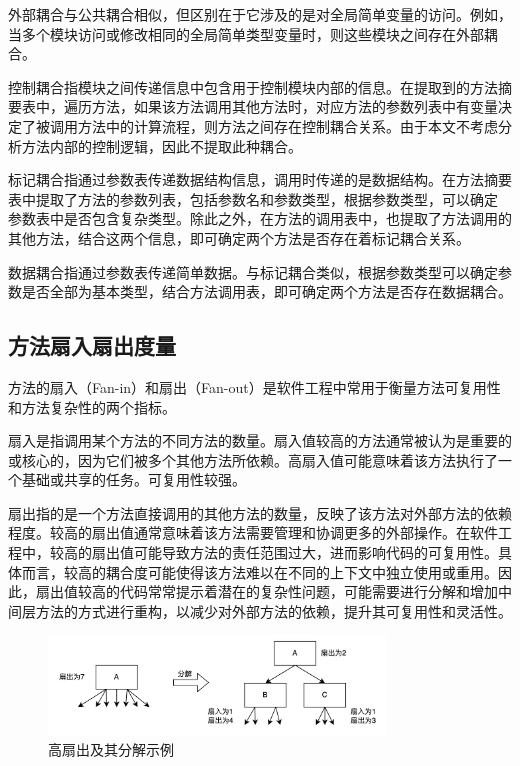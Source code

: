 外部耦合与公共耦合相似，但区别在于它涉及的是对全局简单变量的访问。例如，当多个模块访问或修改相同的全局简单类型变量时，则这些模块之间存在外部耦合。


控制耦合指模块之间传递信息中包含用于控制模块内部的信息。在提取到的方法摘
要表中，遍历方法，如果该方法调用其他方法时，对应方法的参数列表中有变量决定了被调用方法中的计算流程，则方法之间存在控制耦合关系。由于本文不考虑分析方法内部的控制逻辑，因此不提取此种耦合。


标记耦合指通过参数表传递数据结构信息，调用时传递的是数据结构。在方法摘要
表中提取了方法的参数列表，包括参数名和参数类型，根据参数类型，可以确定
参数表中是否包含复杂类型。除此之外，在方法的调用表中，也提取了方法调用的
其他方法，结合这两个信息，即可确定两个方法是否存在着标记耦合关系。


数据耦合指通过参数表传递简单数据。与标记耦合类似，根据参数类型可以确定参
数是否全部为基本类型，结合方法调用表，即可确定两个方法是否存在数据耦合。

\subsection{方法扇入扇出度量}

方法的扇入（Fan-in）和扇出（Fan-out）是软件工程中常用于衡量方法可复用性和方法复杂性的两个指标。



扇入是指调用某个方法的不同方法的数量。扇入值较高的方法通常被认为是重要的或核心的，因为它们被多个其他方法所依赖。高扇入值可能意味着该方法执行了一个基础或共享的任务。可复用性较强。

扇出指的是一个方法直接调用的其他方法的数量，反映了该方法对外部方法的依赖程度。较高的扇出值通常意味着该方法需要管理和协调更多的外部操作。在软件工程中，较高的扇出值可能导致方法的责任范围过大，进而影响代码的可复用性。具体而言，较高的耦合度可能使得该方法难以在不同的上下文中独立使用或重用。因此，扇出值较高的代码常常提示着潜在的复杂性问题，可能需要进行分解和增加中间层方法的方式进行重构，以减少对外部方法的依赖，提升其可复用性和灵活性。

\begin{figure}[h]
\centering
\includegraphics[width = 0.8\textwidth]{figures/扇出介绍.jpg}
\caption{高扇出及其分解示例}
\end{figure}

